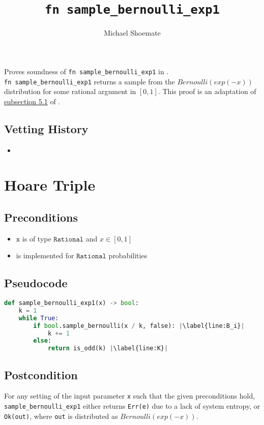 \documentclass{article}
\title{\texttt{fn sample\_bernoulli\_exp1}}
\author{Michael Shoemate}
\begin{document}
\maketitle

\contrib
Proves soundness of \texttt{fn sample\_bernoulli\_exp1} in .\\
\texttt{fn sample\_bernoulli\_exp1} returns a sample from the $Bernoulli(exp(-x))$ distribution for some rational argument in $[0, 1]$.
This proof is an adaptation of \href{https://arxiv.org/pdf/2004.00010.pdf#subsection.5.1}{subsection 5.1} of \cite{CKS20}.

\subsection*{Vetting History}
\begin{itemize}
    \item {}
\end{itemize}

\section{Hoare Triple}
\subsection*{Preconditions}
\begin{itemize}
    \item $\texttt{x}$ is of type $\texttt{Rational}$ and $x \in [0, 1]$
    \item {} is implemented for $\texttt{Rational}$ probabilities
\end{itemize}


\subsection*{Pseudocode}        
\begin{lstlisting}[language=Python, escapechar=|]
def sample_bernoulli_exp1(x) -> bool:
    k = 1
    while True:
        if bool.sample_bernoulli(x / k, false): |\label{line:B_i}|
            k += 1
        else: 
            return is_odd(k) |\label{line:K}|
\end{lstlisting}

\subsection*{Postcondition}
\label{postcondition}
For any setting of the input parameter \texttt{x} such that the given preconditions hold, \\
\texttt{sample\_bernoulli\_exp1} either returns \texttt{Err(e)} due to a lack of system entropy,
or \texttt{Ok(out)}, where \texttt{out} is distributed as $Bernoulli(exp(-x))$.
\end{document}
